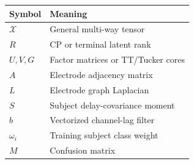 \begin{tabular}{ll}
\toprule
\textbf{Symbol} & \textbf{Meaning}\\
\midrule
$\mathcal{X}$ & General multi-way tensor\\
$R$ & CP or terminal latent rank\\
$U,V,G$ & Factor matrices or TT/Tucker cores\\
$A$ & Electrode adjacency matrix\\
$L$ & Electrode graph Laplacian\\
$S$ & Subject delay-covariance moment\\
$b$ & Vectorized channel-lag filter\\
$\omega_i$ & Training subject class weight\\
$M$ & Confusion matrix\\
\bottomrule
\end{tabular}

